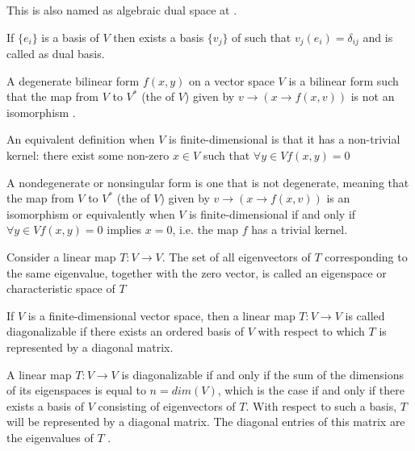 \begin{appendices}
\begin{definition}
  This is also named as algebraic dual space at \cite{wiki:dualspace}.
  \label{def:dualspace}
\end{definition}

\begin{definition}
  If $\{e_i\}$ is a basis of $V$ then exists a basis $\{v_j\}$ of
   such that $v_j(e_i) = \delta_{ij}$ and is
  called as dual basis. 
  \cite{wiki:dualbasis}
  \label{def:dualbasis}
\end{definition}

\begin{definition}
  A degenerate bilinear form $f(x, y)$ on a vector space $V$ is a
  bilinear form such that the map from $V$ to $V^\ast$ (the
  of $V$) given by $v \to (x \to f(x, v) )$ is not an isomorphism
  \cite{wiki:dbf}. 

  An equivalent definition when $V$ is finite-dimensional is that it
  has a non-trivial kernel: there exist some non-zero $x \in V$ such
  that 
  \(
  \forall y \in V f(x,y) = 0
  \)
  \label{def:degeneratebf}
\end{definition}

\begin{definition}
  A nondegenerate or nonsingular form is one that is not degenerate,
  meaning that the map from $V$ to $V^\ast$ (the 
  of $V$) given by $v \to (x \to f(x, v) )$ is an isomorphism
  \cite{wiki:dbf} or equivalently when $V$ is finite-dimensional if
  and only if
  \(
  \forall y \in V f(x,y) = 0
  \)
  implies $x = 0$, i.e. the map $f$ has a trivial kernel.
  \label{def:nondegeneratebf}
\end{definition}

\begin{definition}[Eigenspace]
  Consider a linear map $T: V \to V$.
  The set of all eigenvectors of $T$ corresponding to the same
  eigenvalue, together with the zero vector, is called an eigenspace
  or characteristic space of $T$ \cite{wiki:eigenvalues}
  \label{def:eigenspace}
\end{definition}

\begin{definition}
  If $V$ is a finite-dimensional vector space, then a linear map
  $T: V \to V$ is called diagonalizable if there exists an ordered
  basis of $V$ with respect to which $T$ is represented by a diagonal
  matrix.

  A linear map $T: V \to V$ is diagonalizable if and only if the sum
  of the dimensions of its 
  eigenspaces is equal to $n = dim(V)$, which is the case if and only if
  there exists a basis of $V$ consisting of eigenvectors of $T$. With
  respect to such a basis, $T$ will be represented by a diagonal
  matrix. The diagonal entries of this matrix are the eigenvalues of
  $T$ \cite{wiki:diagonalizable_matrix}.
  \label{def:diagonalizable_map}
\end{definition}


\end{appendices}
